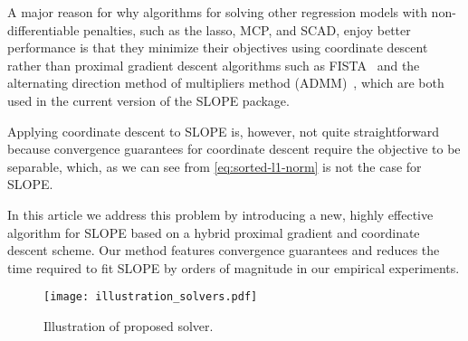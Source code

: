A major reason for why algorithms for solving other regression models with
non-differentiable penalties, such as the lasso, MCP, and SCAD, enjoy better
performance is that they minimize their objectives using coordinate
descent~\cite{breheny2011, friedman2010} rather than proximal gradient descent
algorithms such as FISTA~\cite{beck2009} and the
alternating direction method of multipliers method (ADMM)~\cite{boyd2010},
which are both used in the current version of the SLOPE package.

Applying coordinate descent to SLOPE is, however, not quite straightforward
because convergence guarantees for coordinate descent require the
objective to be separable, which, as we can see from \eqref{eq:sorted-l1-norm}
is not the case for SLOPE. 


In this article we address this problem by introducing a new, highly effective
algorithm for SLOPE based on a hybrid proximal gradient and coordinate descent
scheme. Our method features convergence guarantees and reduces the time
required to fit SLOPE by orders of magnitude in our empirical experiments.

\begin{figure}[htbp]
  \centering
  \texttt{[image: illustration\_solvers.pdf]}
  \caption{Illustration of proposed solver.}
  \label{fig:illustration-solver}
\end{figure}